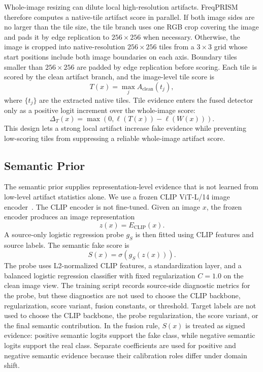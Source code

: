 \documentclass[lettersize,journal]{IEEEtran}
\begin{document}
Whole-image resizing can dilute local high-resolution artifacts. FreqPRISM therefore computes a native-tile artifact score in parallel. If both image sides are no larger than the tile size, the tile branch uses one RGB crop covering the image and pads it by edge replication to $256 \times 256$ when necessary. Otherwise, the image is cropped into native-resolution $256 \times 256$ tiles from a $3 \times 3$ grid whose start positions include both image boundaries on each axis. Boundary tiles smaller than $256 \times 256$ are padded by edge replication before scoring. Each tile is scored by the clean artifact branch, and the image-level tile score is
\begin{equation}
    T(x)=\max_{j} A_{\mathrm{clean}}(t_j),
\end{equation}
where $\{t_j\}$ are the extracted native tiles. Tile evidence enters the fused detector only as a positive logit increment over the whole-image score:
\begin{equation}
    \Delta_T(x)=\max\left(0,\ell(T(x))-\ell(W(x))\right).
\end{equation}
This design lets a strong local artifact increase fake evidence while preventing low-scoring tiles from suppressing a reliable whole-image artifact score.

\subsection{Semantic Prior}
\label{sec:method_semantic}

The semantic prior supplies representation-level evidence that is not learned from low-level artifact statistics alone. We use a frozen CLIP ViT-L/14 image encoder~\cite{radford2021clip}. The CLIP encoder is not fine-tuned. Given an image $x$, the frozen encoder produces an image representation
\begin{equation}
    z(x)=E_{\mathrm{CLIP}}(x).
\end{equation}
A source-only logistic regression probe $g_S$ is then fitted using CLIP features and source labels. The semantic fake score is
\begin{equation}
    S(x)=\sigma(g_S(z(x))).
\end{equation}
The probe uses L2-normalized CLIP features, a standardization layer, and a balanced logistic regression classifier with fixed regularization $C=1.0$ on the clean image view. The training script records source-side diagnostic metrics for the probe, but these diagnostics are not used to choose the CLIP backbone, regularization, score variant, fusion constants, or threshold. Target labels are not used to choose the CLIP backbone, the probe regularization, the score variant, or the final semantic contribution. In the fusion rule, $S(x)$ is treated as signed evidence: positive semantic logits support the fake class, while negative semantic logits support the real class. Separate coefficients are used for positive and negative semantic evidence because their calibration roles differ under domain shift.
\end{document}
